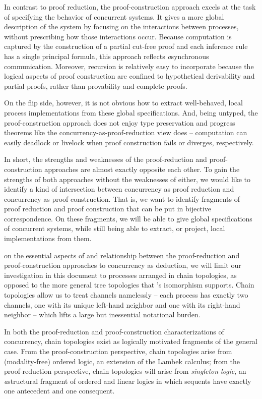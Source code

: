 In contrast to proof reduction, the proof-construction approach excels at the task of specifying the behavior of concurrent systems.
It gives a more global description of the system by focusing on the interactions between processes, without prescribing how those interactions occur.
Because computation is captured by the construction of a partial cut-free proof and each inference rule has a single principal formula, this approach reflects \emph{a}syn\-chronous communication.
Moreover, recursion is relatively easy to incorporate because the logical aspects of proof construction are confined to hypothetical derivability and partial proofs, rather than provability and complete proofs.

On the flip side, however, it is not obvious how to extract well-behaved, local process implementations from these global specifications.
And, being untyped, the proof-construction approach does not enjoy type preservation and progress theorems like the concurrency-as-proof-reduction view does -- computation can easily deadlock or livelock when proof construction fails or diverges, respectively.

In short, the strengths and weaknesses of the proof-reduction and proof-construction approaches are almost exactly opposite each other.
To gain the strengths of both approaches without the weaknesses of either, we would like to identify a kind of intersection between concurrency as proof reduction and concurrency as proof construction.
That is, we want to identify fragments of proof reduction and proof construction that can be put in bijective correspondence.
On these fragments, we will be able to give global specifications of concurrent systems, while still being able to extract, or project, local implementations from them.

 on the essential aspects of and relationship between the proof-reduction and proof-construction approaches to concurrency as deduction, we will limit our investigation in this document to processes arranged in chain topologies, as opposed to the more general tree topologies that \citeauthor{Caires+:MSCS16}'s isomorphism supports.
Chain topologies allow us to treat channels namelessly -- each process has exactly two channels, one with its unique left-hand neighbor and one with its right-hand neighbor -- which lifts a large but inessential notational burden.

In both the proof-reduction and proof-construction characterizations of concurrency, chain topologies exist as logically motivated fragments of the general case.
From the proof-construction perspective, chain topologies arise from (modality-free) ordered logic\autocites{Lambek:SLIM61}{Abrusci:MLQ90}{Kanazawa:LLI92}{Polakow+Pfenning:MFPS99}, an extension of the Lambek calculus\autocite{Lambek:AMM58};
from the proof-reduction perspective, chain topologies will arise from \emph{singleton logic}\autocites{Santocanale:FOSSACS02}{Fortier+Santocanale:CSL13}, an \emph{a}struc\-tural fragment of ordered and linear logics in which sequents have exactly one antecedent and one consequent.

